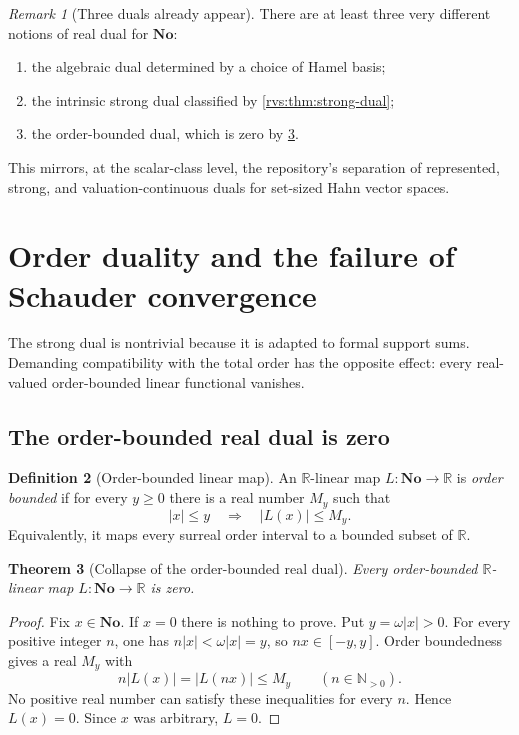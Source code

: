 \documentclass[11pt,letterpaper]{article}
\numberwithin{equation}{section}
\newtheorem{theorem}{Theorem}[section]
\theoremstyle{definition}
\newtheorem{definition}[theorem]{Definition}
\theoremstyle{remark}
\newtheorem{remark}[theorem]{Remark}
\newcommand{\No}{\mathbf{No}}
\newcommand{\R}{\mathbb{R}}
\newcommand{\N}{\mathbb{N}}
\newcommand{\abs}[1]{\lvert #1\rvert}
\begin{document}
\begin{remark}[Three duals already appear]
There are at least three very different notions of real dual for \(\No\):
\begin{enumerate}
\item the algebraic dual determined by a choice of Hamel basis;
\item the intrinsic strong dual classified by \cref{rvs:thm:strong-dual};
\item the order-bounded dual, which is zero by \cref{rvs:thm:order-dual-zero}.
\end{enumerate}
This mirrors, at the scalar-class level, the repository's separation of
represented, strong, and valuation-continuous duals for set-sized Hahn vector
spaces.
\end{remark}

\section{Order duality and the failure of Schauder convergence}\label{rvs:sec:topology}
\label{rvs:cv:sec:topology}

The strong dual is nontrivial because it is adapted to formal support sums.
Demanding compatibility with the total order has the opposite effect: every
real-valued order-bounded linear functional vanishes.

\subsection{The order-bounded real dual is zero}

\begin{definition}[Order-bounded linear map]
An \(\R\)-linear map \(L:\No\to\R\) is \emph{order bounded} if for every
\(y\ge0\) there is a real number \(M_y\) such that
\[
  \abs{x}\le y\quad\Longrightarrow\quad\abs{L(x)}\le M_y.
\]
Equivalently, it maps every surreal order interval to a bounded subset of
\(\R\).
\end{definition}

\begin{theorem}[Collapse of the order-bounded real dual]
\label{rvs:thm:order-dual-zero}
Every order-bounded \(\R\)-linear map \(L:\No\to\R\) is zero.
\end{theorem}

\begin{proof}
Fix \(x\in\No\).  If \(x=0\) there is nothing to prove.  Put
\(y=\omega\abs{x}>0\).  For every positive integer \(n\), one has
\(n\abs{x}<\omega\abs{x}=y\), so \(nx\in[-y,y]\).  Order boundedness gives a
real \(M_y\) with
\[
  n\abs{L(x)}=\abs{L(nx)}\le M_y
  \qquad(n\in\N_{>0}).
\]
No positive real number can satisfy these inequalities for every \(n\).
Hence \(L(x)=0\).  Since \(x\) was arbitrary, \(L=0\).
\end{proof}
\end{document}

